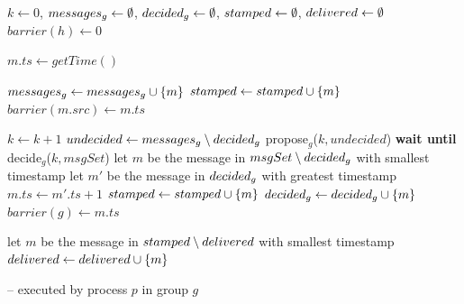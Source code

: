 \documentclass[times, 10pt]{article}
\begin{document}
\begin{algorithm}
\begin{distribalgo}[1]

\blankline
{}
  \STATE $k \leftarrow 0$, $messages\text{$_g$} \leftarrow \emptyset$, $decided\text{$_g$} \leftarrow \emptyset$, $stamped \leftarrow \emptyset$, $delivered \leftarrow \emptyset$
    \STATE $barrier(h) \leftarrow 0$ 
  \ENDINDENT
\ENDINDENT 

\blankline
{}
  \STATE $m.ts \leftarrow getTime()$ \label{algline:gettime}
  \STATE {} \label{algline:rmlocal}
\ENDINDENT

\blankline
{}
    \STATE $messages\text{$_g$} \leftarrow messages\text{$_g$} \cup \{m\}$ \label{algline:addtogroupmsgs}
   \label{algline:notbptwice}
    \STATE $stamped \leftarrow stamped \cup \{m\}$ \label{algline:insbp1}
    \STATE $barrier(m.src) \leftarrow m.ts$ \label{algline:incbar}
  \ENDIF
\ENDWHEN

\blankline
\WHEN{$\localmsgs \setminus \decided \neq \emptyset$}
  \STATE $k \leftarrow k + 1$
  \STATE $undecided \leftarrow messages\text{$_g$} \setminus decided\text{$_g$}$ \label{algline:undecided}
  \STATE propose$_g$($k, undecided$) \label{algline:propose}
  \STATE \textbf{wait until} decide$_g$($k, msgSet$) \label{algline:decide}
    \STATE let $m$ be the message in $msgSet \setminus decided\text{$_g$}$ with smallest timestamp \label{algline:decidedloopbegin}
    \STATE let $m'$ be the message in $decided\text{$_g$}$ with greatest timestamp
      \STATE $m.ts \leftarrow m'.ts + 1$ \label{algline:changetsafterdecision}
    \ENDIF     
     \label{algline:checkcons}
      \STATE $stamped \leftarrow stamped \cup \{m\}$  \label{algline:insbp2}
    \ENDIF
    \STATE $decided\text{$_g$} \leftarrow decided\text{$_g$} \cup \{m\}$  \label{algline:addtodecided}
    \STATE $barrier(g) \leftarrow m.ts$ \label{algline:incbarlocal}
    \STATE {} \label{algline:rmothers}
  \ENDWHILE

\ENDWHEN

\blankline
\WHEN{$\stamped \setminus \delivered \neq \emptyset$} \label{algline:inammulticast}
  \STATE let $m$ be the message in $stamped \setminus delivered$ with smallest timestamp \label{algline:condel1}
   \label{algline:condel2}
      \STATE {} \label{algline:consdeliver}
    \STATE $delivered \leftarrow delivered \cup \{m\}$ \label{algline:addtodelivered}
  \ENDIF
\ENDWHEN
\blankline

\caption{ -- executed by process $p$ in group $g$}
\label{algorithm:deliveryminimal}
\end{distribalgo}
\end{algorithm}
\end{document}
